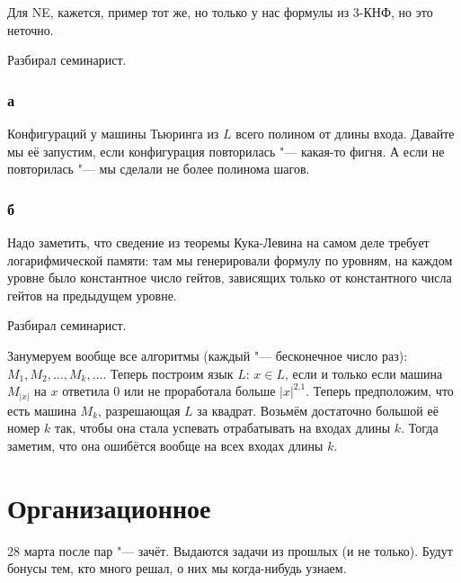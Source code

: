 		Для NE, кажется, пример тот же, но только у нас формулы из 3-КНФ, но это неточно.

	Разбирал семинарист.

	\subsubsection{а}
		Конфигураций у машины Тьюринга из $L$ всего полином от длины входа.
		Давайте мы её запустим, если конфигурация повторилась "--- какая-то фигня.
		А если не повторилась "--- мы сделали не более полинома шагов.

	\subsubsection{б}
		Надо заметить, что сведение из теоремы Кука-Левина на самом деле требует логарифмической памяти:
		там мы генерировали формулу по уровням, на каждом уровне было константное число гейтов,
		зависящих только от константного числа гейтов на предыдущем уровне.

	Разбирал семинарист.

	Занумеруем вообще все алгоритмы (каждый "--- бесконечное число раз): $M_1, M_2, \dots, M_k, \dots$.%
	Теперь построим язык $L$: $x \in L$, если и только если машина $M_{|x|}$ на $x$ ответила 0 или не проработала
	больше $|x|^{2.1}$.
	Теперь предположим, что есть машина $M_k$, разрешающая $L$ за квадрат.
	Возьмём достаточно большой её номер $k$ так, чтобы она стала успевать отрабатывать на входах длины $k$.
	Тогда заметим, что она ошибётся вообще на всех входах длины $k$.

\section{Организационное}
	28 марта после пар "--- зачёт.
	Выдаются задачи из прошлых (и не только).
	Будут бонусы тем, кто много решал, о них мы когда-нибудь узнаем.

